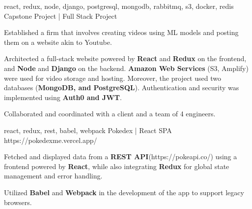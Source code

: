 


\begin{cventries}



  \cventry
    {react, redux, node, django, postgresql, mongodb, rabbitmq, s3, docker, redis } %
    {Capstone Project | Full Stack Project}  %
    {} %
    {} 
    { 
      \begin{cvitems} %
        \item {Established a firm that involves creating videos using ML models and posting them on a website akin to Youtube.} 
        \item {Architected a full-stack website powered by \textbf{React} and \textbf{Redux} on the frontend, and \textbf{Node} and \textbf{Django} on the backend. \textbf{Amazon Web Services} (S3, Amplify) were used for video storage and hosting. Moreover, the project used two databases (\textbf{MongoDB, and PostgreSQL}). Authentication and security was implemented using \textbf{Auth0 and JWT}.}    
        \item {Collaborated and coordinated with a client and a team of 4 engineers.} 
      \end{cvitems}
    }

  \cventry
    {react, redux, rest, babel, webpack} %
    {Pokedex | React SPA}  %
    {https://pokedexme.vercel.app/} %
    {} 
    {
      \begin{cvitems} %
        \item {Fetched and displayed data from a \textbf{REST API}(https://pokeapi.co/) using a frontend powered by \textbf{React}, while also integrating \textbf{Redux}  for global state management and error handling.}   
        \item {Utilized \textbf{Babel} and \textbf{Webpack}  in the development of the app to support legacy browsers.}   
      \end{cvitems}
    }


\end{cventries}
